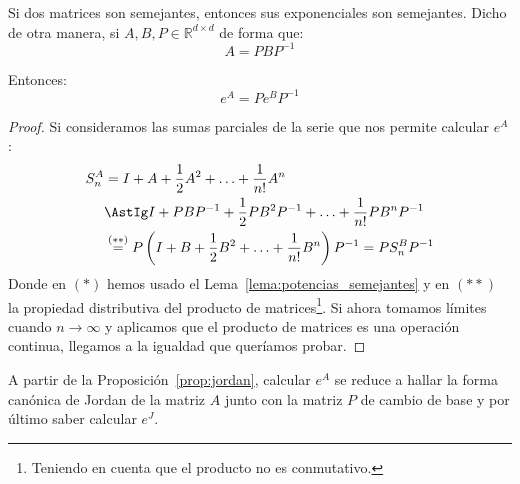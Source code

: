 \begin{prop}\label{prop:jordan}
    Si dos matrices son semejantes, entonces sus exponenciales son semejantes. Dicho de otra manera, si $A,B,P\in \mathbb{R}^{d\times d}$ de forma que:
    \begin{equation*}
        A = PBP^{-1}
    \end{equation*}

    Entonces:
    \begin{equation*}
        e^A = P e^B P^{-1}
    \end{equation*}
    \begin{proof}
        Si consideramos las sumas parciales de la serie que nos permite calcular $e^A$:
        \begin{align*}
            S_n^A &= I + A + \dfrac{1}{2}A^2 + \ldots + \dfrac{1}{n!}A^n \\
                &\AstIg  I + PBP^{-1} + \dfrac{1}{2} PB^2 P^{-1} + \ldots + \dfrac{1}{n!} PB^nP^{-1} \\
                &\stackrel{(\ast\ast)}{=} P\left( I + B + \dfrac{1}{2}B^2 + \ldots + \dfrac{1}{n!}B^n \right)P^{-1} = PS_n^BP^{-1}
        \end{align*}
        Donde en $(\ast)$ hemos usado el Lema~\ref{lema:potencias_semejantes} y en $(\ast\ast)$ la propiedad distributiva del producto de matrices\footnote{Teniendo en cuenta que el producto no es conmutativo.}. Si ahora tomamos límites cuando $n\rightarrow\infty$ y aplicamos que el producto de matrices es una operación continua, llegamos a la igualdad que queríamos probar.
    \end{proof}
\end{prop}

A partir de la Proposición~\ref{prop:jordan}, calcular $e^A$ se reduce a hallar la forma canónica de Jordan de la matriz $A$ junto con la matriz $P$ de cambio de base y por último saber calcular $e^J$.\\

